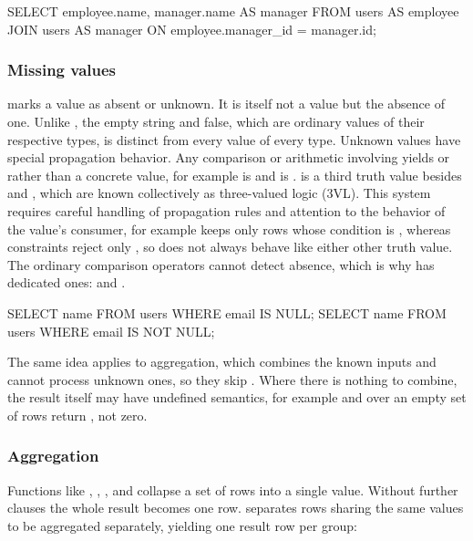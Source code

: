 \begin{sqlblock}
SELECT employee.name, manager.name AS manager
FROM users AS employee
JOIN users AS manager ON employee.manager_id = manager.id;
\end{sqlblock}

\subsubsection{Missing values}

 marks a value as absent or unknown.
It is itself not a value but the absence of one.
Unlike , the empty string and false,
which are ordinary values of their respective types,
 is distinct from every value of every type.
Unknown values have special propagation behavior.
Any comparison or arithmetic involving 
yields  or  rather than a concrete value,
for example  is  and  is .
 is a third truth value besides  and ,
which are known collectively as three-valued logic (3VL).
This system requires careful handling of propagation rules
and attention to the behavior of the value's consumer,
for example  keeps only rows whose condition is ,
whereas  constraints reject only ,
so  does not always behave like either other truth value.
The ordinary comparison operators cannot detect absence,
which is why  has dedicated ones:  and .

\begin{sqlblock}
SELECT name FROM users WHERE email IS NULL;
SELECT name FROM users WHERE email IS NOT NULL;
\end{sqlblock}

The same idea applies to aggregation, which combines the known inputs
and cannot process unknown ones, so they skip .
Where there is nothing to combine,
the result itself may have undefined semantics,
for example  and  over an empty set of rows
return , not zero.

\subsubsection{Aggregation}

Functions like , , ,  and 
collapse a set of rows into a single value.
Without further clauses the whole result becomes one row.
 separates rows sharing the same values to be aggregated separately,
yielding one result row per group:

